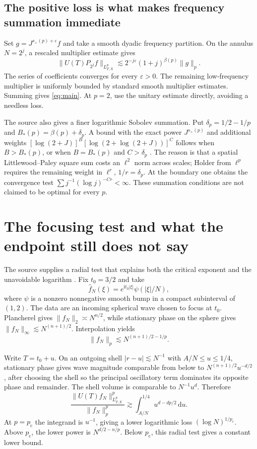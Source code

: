 \documentclass[11pt,a4paper]{article}
\numberwithin{equation}{section}
\theoremstyle{definition}
\theoremstyle{remark}
\newcommand{\eps}{\varepsilon}
\newcommand{\dd}{\,\mathrm d}
\newcommand{\pc}{p_{\mathrm c}}
\begin{document}
\subsection{The positive loss is what makes frequency summation immediate}
Set $g=J^{s_+(p)+\eps}f$ and take a smooth dyadic frequency partition.
On the annulus $N=2^j$, a rescaled multiplier estimate gives
\[
 \|U(T)P_{2^j}f\|_{L^p_{T,X}}
 \lesssim 2^{-j\eps}(1+j)^{\beta(p)}\|g\|_p.
\]
The series of coefficients converges for every $\eps>0$. The remaining
low-frequency multiplier is uniformly bounded by standard smooth multiplier
estimates. Summing gives \eqref{eq:main}. At $p=2$, use the unitary estimate
directly, avoiding a needless loss.

The source also gives a finer logarithmic Sobolev summation. Put
$\delta_p=1/2-1/p$ and $B_*(p)=\beta(p)+\delta_p$. A bound with the exact
power $J^{s_+(p)}$ and additional weights
$[\log(2+J)]^B[\log(2+\log(2+J))]^C$ follows when $B>B_*(p)$, or when
$B=B_*(p)$ and $C>\delta_p$ \cite{transfer}. The reason is that a spatial
Littlewood--Paley square sum costs an $\ell^2$ norm across scales; Holder from
$\ell^p$ requires the remaining weight in $\ell^r$, $1/r=\delta_p$.
At the boundary one obtains the convergence test
$\sum j^{-1}(\log j)^{-Cr}<\infty$. These summation conditions are not
claimed to be optimal for every $p$.

\section{The focusing test and what the endpoint still does not say}
\label{sec:sharpness}
The source supplies a radial test that explains both the critical exponent
and the unavoidable logarithm \cite{sharpness}. Fix $t_0=3/2$ and take
\[
 \widehat f_N(\xi)=e^{\mathrm it_0|\xi|}\psi(|\xi|/N),
\]
where $\psi$ is a nonzero nonnegative smooth bump in a compact subinterval of
$(1,2)$. The data are an incoming spherical wave chosen to focus at $t_0$.
Plancherel gives $\|f_N\|_2\asymp N^{n/2}$, while stationary phase on the
sphere gives $\|f_N\|_\infty\lesssim N^{(n+1)/2}$. Interpolation yields
\[
 \|f_N\|_p\lesssim N^{(n+1)/2-1/p}.
\]

Write $T=t_0+u$. On an outgoing shell $|r-u|\lesssim N^{-1}$ with
$A/N\le u\le1/4$, stationary phase gives wave magnitude comparable from
below to $N^{(n+1)/2}u^{-d/2}$, after choosing the shell so the principal
oscillatory term dominates its opposite phase and remainder. The shell volume
is comparable to $N^{-1}u^d$. Therefore
\begin{equation}\label{eq:focusintegral}
 \frac{\|U(T)f_N\|_{L^p_{T,X}}^p}{\|f_N\|_p^p}
 \gtrsim \int_{A/N}^{1/4}u^{d-dp/2}\dd u.
\end{equation}
At $p=\pc$ the integrand is $u^{-1}$, giving a lower logarithmic loss
$(\log N)^{1/\pc}$. Above $\pc$, the lower power is
$N^{d/2-n/p}$. Below $\pc$, this radial test gives a constant lower bound.
\end{document}
